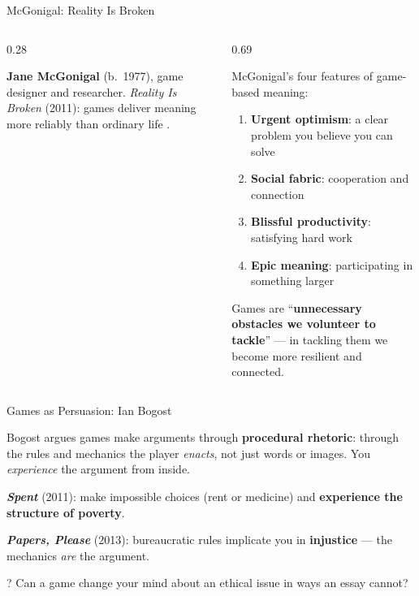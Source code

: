 \documentclass[aspectratio=169,11pt]{beamer}
\begin{document}
\begin{frame}[t]{McGonigal: Reality Is Broken}
\begin{columns}[T]
\begin{column}{0.28\textwidth}
\begin{conceptbox}
\scriptsize
\textbf{Jane McGonigal} (b.~1977), game designer and researcher. \emph{Reality Is Broken} (2011): games deliver meaning more reliably than ordinary life \parencite{mcgonigal_reality_broken}.
\end{conceptbox}
\end{column}
\begin{column}{0.69\textwidth}
\begin{conceptbox}
\footnotesize
McGonigal's four features of game-based meaning:
\begin{enumerate}
    \item \textbf{Urgent optimism}: a clear problem you believe you can solve
    \item \textbf{Social fabric}: cooperation and connection
    \item \textbf{Blissful productivity}: satisfying hard work
    \item \textbf{Epic meaning}: participating in something larger
\end{enumerate}

\vspace{0.05cm}
Games are ``\textbf{unnecessary obstacles we volunteer to tackle}'' --- in tackling them we become more resilient and connected.
\end{conceptbox}
\end{column}
\end{columns}
\end{frame}

\begin{frame}[t]{Games as Persuasion: Ian Bogost}
\begin{conceptbox}
\footnotesize
Bogost argues games make arguments through \textbf{procedural rhetoric}: through the rules and mechanics the player \emph{enacts}, not just words or images. You \emph{experience} the argument from inside.
\end{conceptbox}

\vspace{0.05cm}
\begin{casestudybox}
\scriptsize
\textbf{\emph{Spent}} (2011): make impossible choices (rent or medicine) and \textbf{experience the structure of poverty}.

\textbf{\emph{Papers, Please}} (2013): bureaucratic rules implicate you in \textbf{injustice} --- the mechanics \emph{are} the argument.
\end{casestudybox}

\begin{alertblock}{?}
\scriptsize
Can a game change your mind about an ethical issue in ways an essay cannot?
\end{alertblock}
\end{frame}
\end{document}
